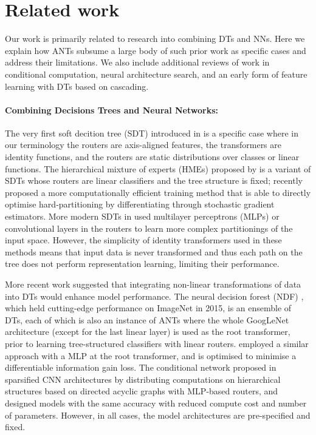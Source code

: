 \section{Related work}\label{sec:relatedwork}

Our work is primarily related to research into combining DTs and NNs. Here we explain how ANTs subsume a large body of such prior work as specific cases and address their limitations. We also include additional reviews of work in conditional computation, neural architecture search, and an early form of feature learning with DTs based on cascading. 

\paragraph{Combining Decisions Trees and Neural Networks:}
The very first soft decition tree (SDT) introduced in \cite{suarez1999globally} is a specific case where in our terminology the routers are axis-aligned features, the transformers are identity functions, and the routers are static distributions over classes or linear functions. The hierarchical mixture of experts (HMEs) proposed by \cite{jordan1994hierarchical} is a variant of SDTs whose routers are linear classifiers and the tree structure is fixed; \cite{leon2015policy} recently proposed a more computationally efficient training method that is able to directly optimise hard-partitioning by differentiating through stochastic gradient estimators. More modern SDTs in \cite{rota2014neural,laptev2014convolutional,frosst2017distilling} used multilayer perceptrons (MLPs) or convolutional layers in the routers to learn more complex partitionings of the input space. However, the simplicity of identity transformers used in these methods means that input data is never transformed and thus each path on the tree does not perform representation learning, limiting their performance.

More recent work suggested that integrating non-linear transformations of data into DTs would enhance model performance. The neural decision forest (NDF) \cite{kontschieder2015deep}, which held cutting-edge performance on ImageNet \cite{deng2009imagenet} in 2015, is an ensemble of DTs, each of which is also an instance of ANTs where the whole GoogLeNet architecture \cite{szegedy2015going} (except for the last linear layer) is used as the root transformer, prior to learning tree-structured classifiers with linear routers. \cite{xiao2017ndt} employed a similar approach with a MLP at the root transformer, and is optimised to minimise a differentiable information gain loss. The conditional network proposed in \cite{ioannou2016decision} sparsified CNN architectures by distributing computations on hierarchical structures based on directed acyclic graphs with MLP-based routers, and designed models with the same accuracy with reduced compute cost and number of parameters. However, in all cases, the model architectures are pre-specified and fixed.

